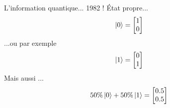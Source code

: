 \documentclass{beamer}
\begin{document}
\begin{frame}{L'information quantique... 1982 !}
  \'Etat propre...
  \begin{equation*}
    \ket{0} =
    \begin{bmatrix}
      1 \\
      0 
    \end{bmatrix}
  \end{equation*}
  ...ou par exemple
  \begin{equation*}
    \ket{1} =
    \begin{bmatrix}
      0 \\
      1 
    \end{bmatrix}
  \end{equation*}
    Mais aussi ...
  \begin{equation*}
    50\%\ket{0} + 50\%\ket{1} =
    \begin{bmatrix}
      0.5 \\
      0.5 
    \end{bmatrix}
  \end{equation*}
\end{frame}
\end{document}
